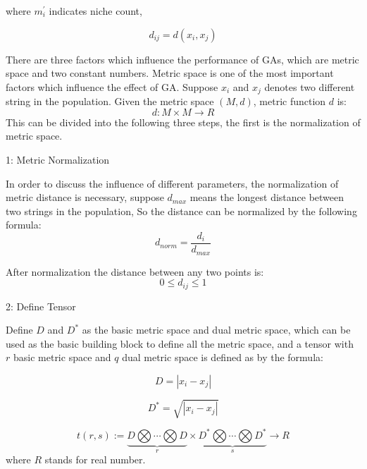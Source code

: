 \documentclass[smallextended]{svjour3}       %
\begin{document}
\begin{multicols}{2}
where $m_i^{\prime}$ indicates niche count,





\begin{equation}
d_{ij} = d(x_i,x_j)
\end{equation}

There are three factors which influence the performance of GAs, which are metric
space and two constant numbers.  Metric space is one of the most important
factors which influence the effect of GA.  Suppose $x_i$ and $x_j$ denotes two
different string in the population. Given the metric space $(M,d)$, metric
function $d$ is: $$d: M\times M \rightarrow R$$
This can be divided into the following three steps, the first is the
normalization of metric space.

1: Metric Normalization

In order to discuss the influence of different parameters, the normalization of
metric distance is necessary, suppose $d_{max}$ means the longest distance
between two strings in the population, So the distance can be normalized by the
following formula:
\begin{equation}
d_{norm} = \frac{d_i}{d_{max}}
\end{equation}

After normalization the distance between any two points is:
\begin{equation}
    0 \leq d_{ij}\leq 1 
\end{equation}


2: Define Tensor

Define $D$ and $D^{\ast}$ as the basic metric space and dual metric space, which
can be used as the basic building block to define all the metric space, and a
tensor with $r$ basic metric space and $q$ dual metric space is defined as by
the formula:

\begin{equation}
    D = |x_i-x_j|
\end{equation}

\begin{equation}
    D^{\ast} = \sqrt{|x_i-x_j|}
\end{equation}

\begin{equation}
t(r,s):= \underbrace{D \bigotimes \cdots \bigotimes D}_{r} \times \underbrace{D^{\ast} \bigotimes 
\cdots \bigotimes D^{\ast}}_{s} \rightarrow R
\end{equation}
where $R$ stands for real number.


\end{multicols}
\end{document}
